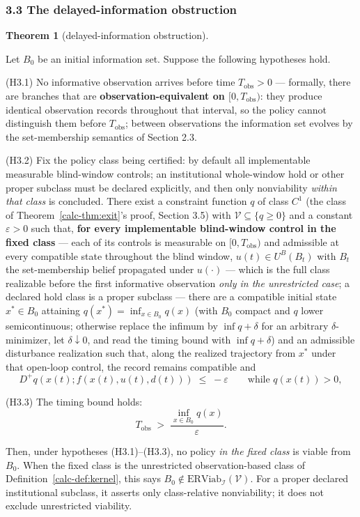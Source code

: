 \documentclass[10pt,twocolumn]{article}
\theoremstyle{definition}
\newtheorem{theorem}{Theorem}
\begin{document}
\subsubsection{3.3 The delayed-information
obstruction}\label{calc-the-delayed-information-obstruction}

\begin{theorem}[delayed-information obstruction]\label{calc-thm:delayed}

Let \(B_0\) be an initial information set. Suppose the following
hypotheses hold.

(H3.1) No informative observation arrives before time
\(T_{\mathrm{obs}} > 0\) --- formally, there are branches that are
\textbf{observation-equivalent on \([0, T_{\mathrm{obs}})\)}: they
produce identical observation records throughout that interval, so the
policy cannot distinguish them before \(T_{\mathrm{obs}}\); between
observations the information set evolves by the set-membership semantics
of Section 2.3.

(H3.2) Fix the policy class being certified: by default all
implementable measurable blind-window controls; an institutional
whole-window hold or other proper subclass must be declared explicitly,
and then only nonviability \emph{within that class} is concluded. There
exist a constraint function \(q\) of class \(C^1\) (the class of Theorem~\ref{calc-thm:exit}'s proof, Section 3.5) with \(\mathcal{V} \subseteq \{ q \ge 0 \}\)
and a constant \(\varepsilon > 0\) such that, \textbf{for every implementable blind-window control in the fixed class} ---
each of its controls is measurable on \([0, T_{\mathrm{obs}})\) and admissible at
every compatible state throughout the blind window, \(u(t) \in U^B(B_t)\)
with \(B_t\) the set-membership belief propagated under \(u(\cdot)\) ---
which is the full class realizable before the first informative
observation \emph{only in the unrestricted case}; a declared hold class
is a proper subclass --- there are a compatible initial state \(x^* \in B_0\) attaining
\(q(x^*) = \inf_{x \in B_0} q(x)\) (with \(B_0\) compact and \(q\) lower
semicontinuous; otherwise replace the infimum by \(\inf q + \delta\) for
an arbitrary \(\delta\)-minimizer, let \(\delta \downarrow 0\), and read
the timing bound with \(\inf q + \delta\)) and an admissible disturbance
realization such that, along the realized trajectory from \(x^*\) under
that open-loop control, the record remains compatible and
\[D^+ q(x(t); f(x(t), u(t), d(t))) \;\le\; -\varepsilon \qquad \text{while } q(x(t)) > 0, \tag{2}\]

(H3.3) The timing bound holds:
\[T_{\mathrm{obs}} \;>\; \frac{\inf_{x \in B_0} q(x)}{\varepsilon}. \tag{3}\]

Then, under hypotheses (H3.1)--(H3.3), no policy \emph{in the
fixed class} is viable from \(B_0\). When the fixed class is the
unrestricted observation-based class of Definition~\ref{calc-def:kernel},
this says \(B_0\notin\mathrm{ERViab}_{\mathcal I}(\mathcal V)\).
For a proper declared institutional subclass, it asserts only
class-relative nonviability; it does not exclude unrestricted viability.

\end{theorem}
\end{document}
